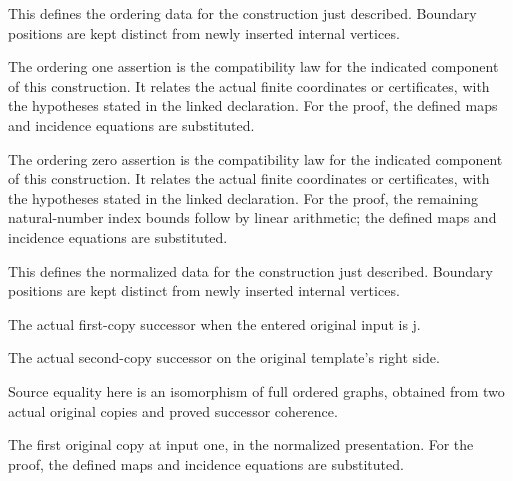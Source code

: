 This defines the ordering data for the construction just described. Boundary positions are kept distinct from newly inserted internal vertices.
\par{}

The ordering one assertion is the compatibility law for the indicated component of this construction. It relates the actual finite coordinates or certificates, with the hypotheses stated in the linked declaration.
For the proof, the defined maps and incidence equations are substituted.
\par{}

The ordering zero assertion is the compatibility law for the indicated component of this construction. It relates the actual finite coordinates or certificates, with the hypotheses stated in the linked declaration.
For the proof, the remaining natural-number index bounds follow by linear arithmetic; the defined maps and incidence equations are substituted.
\par{}

This defines the normalized data for the construction just described. Boundary positions are kept distinct from newly inserted internal vertices.
\par{}

The actual first-copy successor when the entered original input is j.
\par{}

The actual second-copy successor on the original template's right side.
\par{}

Source equality here is an isomorphism of full ordered graphs, obtained from two actual original copies and proved successor coherence.
\par{}

The first original copy at input one, in the normalized presentation.
For the proof, the defined maps and incidence equations are substituted.
\par{}

